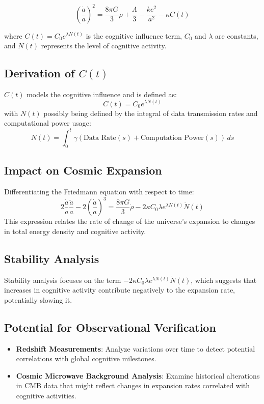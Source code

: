 \documentclass{article}
\begin{document}
\begin{equation}
\left(\frac{\dot{a}}{a}\right)^2 = \frac{8\pi G}{3}\rho + \frac{\Lambda}{3} - \frac{kc^2}{a^2} - \kappa C(t)
\end{equation}

where \( C(t) = C_0 e^{\lambda N(t)} \) is the cognitive influence term, \( C_0 \) and \( \lambda \) are constants, and \( N(t) \) represents the level of cognitive activity.

\subsection{Derivation of \( C(t) \)}
\( C(t) \) models the cognitive influence and is defined as:
\begin{equation}
C(t) = C_0 e^{\lambda N(t)}
\end{equation}
with \( N(t) \) possibly being defined by the integral of data transmission rates and computational power usage:
\begin{equation}
N(t) = \int_{0}^{t} \gamma (\text{Data Rate}(s) + \text{Computation Power}(s)) \, ds
\end{equation}

\subsection{Impact on Cosmic Expansion}
Differentiating the Friedmann equation with respect to time:
\begin{equation}
2\frac{\dot{a}}{a}\frac{\ddot{a}}{a} - 2\left(\frac{\dot{a}}{a}\right)^3 = \frac{8\pi G}{3} \dot{\rho} - 2\kappa C_0 \lambda e^{\lambda N(t)} \dot{N}(t)
\end{equation}
This expression relates the rate of change of the universe's expansion to changes in total energy density and cognitive activity.

\subsection{Stability Analysis}
Stability analysis focuses on the term \( -2\kappa C_0 \lambda e^{\lambda N(t)} \dot{N}(t) \), which suggests that increases in cognitive activity contribute negatively to the expansion rate, potentially slowing it.

\subsection{Potential for Observational Verification}
\begin{itemize}
    \item \textbf{Redshift Measurements}: Analyze variations over time to detect potential correlations with global cognitive milestones.
    \item \textbf{Cosmic Microwave Background Analysis}: Examine historical alterations in CMB data that might reflect changes in expansion rates correlated with cognitive activities.
\end{itemize}
\end{document}
